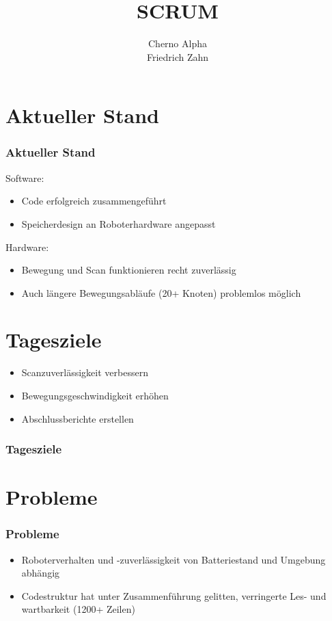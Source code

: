 \documentclass[ddcfooter,nototalpage]{tudbeamer}
\begin{document}
\normalsize
{}
\title{SCRUM}
\author{Cherno Alpha\\Friedrich Zahn}
\maketitle

\section{Aktueller Stand}
\begin{frame}
\frametitle{Aktueller Stand}
Software:
\begin{itemize}
  \item Code erfolgreich zusammengeführt
  \item Speicherdesign an Roboterhardware angepasst
\end{itemize}
Hardware:
\begin{itemize}
  \item Bewegung und Scan funktionieren recht zuverlässig
  \item Auch längere Bewegungsabläufe (20+ Knoten) problemlos möglich
\end{itemize}
\end{frame}

\section{Tagesziele}
\begin{frame}
  \begin{itemize}
    \item Scanzuverlässigkeit verbessern
    \item Bewegungsgeschwindigkeit erhöhen
    \item Abschlussberichte erstellen
  \end{itemize}
\frametitle{Tagesziele}
\end{frame}

\section{Probleme}
\begin{frame}
\frametitle{Probleme}
\begin{itemize}
  \item Roboterverhalten und -zuverlässigkeit von Batteriestand und Umgebung 
  abhängig
  \item Codestruktur hat unter Zusammenführung gelitten, verringerte Les- und
  wartbarkeit (1200+ Zeilen)
\end{itemize}
\end{frame}
\end{document}
